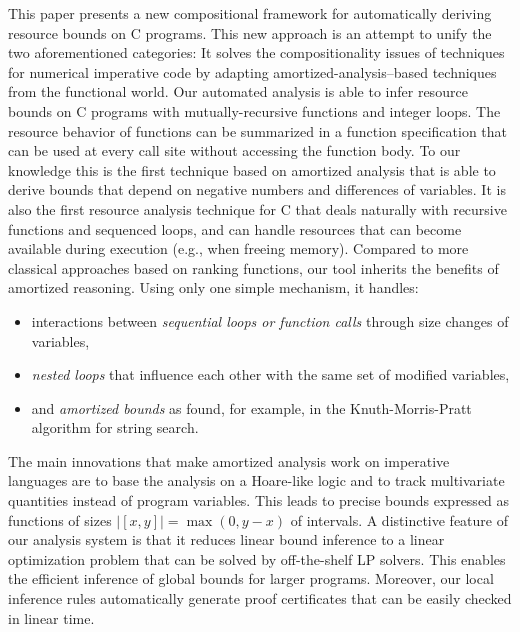 \documentclass{sigplanconf}
\newcommand{\ifshort}[2]{\ifx\fullversion\undefined{#1}\else{#2}\fi}
\newcommand{\itemskip}[0]{\ifshort{\vspace{-3pt}}{}}
\newcommand{\itemskipIn}[0]{\ifshort{\vspace{-1pt}}{}}
\begin{document}
This paper presents a new compositional framework for automatically
deriving resource bounds on C programs.  This new
approach is an attempt to unify the two aforementioned
categories: It solves the compositionality issues of techniques
for numerical imperative code by adapting amortized-analysis--based
techniques from the functional world.
%
Our automated analysis is able to infer
resource bounds on C programs with mutually-recursive functions and integer loops.
%
The resource behavior of functions can be summarized
in a function specification that can be used at every
call site without accessing the function body.
%
To our knowledge this is the first technique based on
amortized analysis that is able to derive bounds that depend on negative numbers
and differences of variables.  It is also the first
resource analysis technique for C that deals naturally with
recursive functions and sequenced loops, and can handle resources that can
become available during execution (e.g., when freeing
memory).  Compared to more classical
approaches based on ranking functions, our tool inherits
the benefits of amortized reasoning.  Using only one
simple mechanism, it handles:
\itemskip
\begin{itemize}
\item interactions between \emph{sequential loops or
  function calls} through size changes of variables,
\itemskipIn
\item \emph{nested loops} that influence each other
  with the same set of modified variables,
\itemskipIn
\item and \emph{amortized bounds} as found, for example, in
  the Knuth-Morris-Pratt algorithm for string search.
\end{itemize}
\itemskip
The main innovations that make amortized analysis work
on imperative languages are to base the analysis on a
Hoare-like logic and to track multivariate quantities instead
of program variables.  This leads to precise bounds
expressed as functions of sizes $|[x, y]| = \max(0, y-x)$ of
intervals.
%
A distinctive feature of our analysis system is that
it reduces linear bound inference  to a linear optimization problem
that can be solved by off-the-shelf LP solvers.  This enables the
efficient inference of global bounds for larger programs.
%
Moreover, our local inference rules automatically generate
proof certificates that can be easily checked in linear time.
\end{document}
